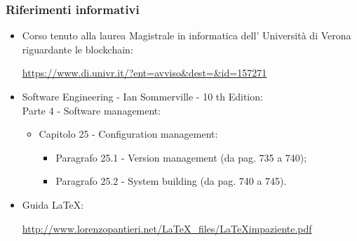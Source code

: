 \subsubsection{Riferimenti informativi}
\begin {itemize}
    \item Corso tenuto alla laurea Magistrale in informatica dell' Università di Verona riguardante le blockchain\glo{}:
    \begin{center}
        \url{https://www.di.univr.it/?ent=avviso&dest=&id=157271}
    \end{center}
    
    \item Software Engineering - Ian Sommerville - 10 th Edition:\\
    Parte 4 - Software management:
    \begin{itemize}
        \item Capitolo 25 - Configuration management:
    
    \begin{itemize}
        \item Paragrafo 25.1 - Version management (da pag. 735 a 740);
        \item Paragrafo 25.2 - System building (da pag. 740 a 745).
    \end{itemize}
\end{itemize}
    \item Guida \LaTeX:
    \begin{center}
        \url{http://www.lorenzopantieri.net/LaTeX_files/LaTeXimpaziente.pdf}
    \end{center}
\end{itemize}